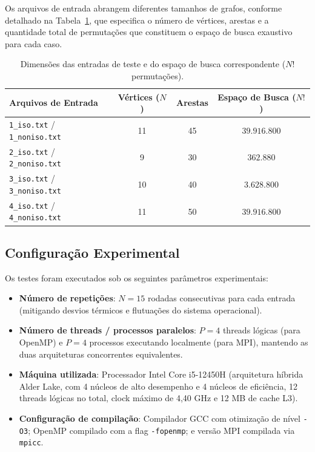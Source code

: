\documentclass[12pt,a4paper]{article}
\begin{document}
Os arquivos de entrada abrangem diferentes tamanhos de grafos,
conforme detalhado na Tabela~\ref{tab:entradas},
que especifica o número de vértices,
arestas e a quantidade total de permutações que constituem o espaço de busca exaustivo para cada caso.

\begin{table}[H]
\centering
\caption{Dimensões das entradas de teste e do espaço de busca correspondente ($N!$ permutações).}
\label{tab:entradas}
\begin{tabular}{lccc}
\hline
\textbf{Arquivos de Entrada} & \textbf{Vértices ($N$)} & \textbf{Arestas} & \textbf{Espaço de Busca ($N!$)} \\ \hline
\texttt{1\_iso.txt} / \texttt{1\_noniso.txt} & 11 & 45 & $39.916.800$ \\
\texttt{2\_iso.txt} / \texttt{2\_noniso.txt} & 9  & 30 & $362.880$    \\
\texttt{3\_iso.txt} / \texttt{3\_noniso.txt} & 10 & 40 & $3.628.800$  \\
\texttt{4\_iso.txt} / \texttt{4\_noniso.txt} & 11 & 50 & $39.916.800$ \\ \hline
\end{tabular}
\end{table}

\subsection{Configuração Experimental}

Os testes foram executados sob os seguintes parâmetros experimentais:

\begin{itemize}
    \item \textbf{Número de repetições}:
    $N = 15$ rodadas consecutivas para cada entrada (mitigando desvios térmicos e flutuações do sistema operacional).
    \item \textbf{Número de threads / processos paralelos}:
    $P = 4$ threads lógicas (para OpenMP) e $P = 4$ processos executando localmente (para MPI),
    mantendo as duas arquiteturas concorrentes equivalentes.
    \item \textbf{Máquina utilizada}:
    Processador Intel Core i5-12450H (arquitetura híbrida Alder Lake,
    com 4 núcleos de alto desempenho e 4 núcleos de eficiência,
    12 threads lógicas no total,
    clock máximo de 4,40 GHz e 12 MB de cache L3).
    \item \textbf{Configuração de compilação}:
    Compilador GCC com otimização de nível \texttt{-O3};
    OpenMP compilado com a flag \texttt{-fopenmp};
    e versão MPI compilada via \texttt{mpicc}.
\end{itemize}
\end{document}
